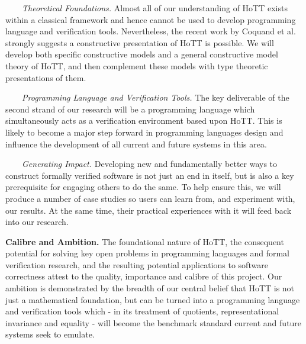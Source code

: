 \documentclass[a4paper,11pt]{article}
\begin{document}



$\;\;\; \;\;\;$ {\em Theoretical Foundations.} Almost all of our understanding
  of HoTT exists within a classical framework and hence cannot be used
  to develop programming language and verification tools. Nevertheless, the recent
  work by Coquand et al. strongly suggests a constructive presentation of HoTT
  is possible. We will develop both specific constructive models
  and a general constructive model theory of HoTT, and then complement
  these models with type theoretic presentations of them.

$\;\;\;\;\;\;$ {\em Programming Language and Verification Tools.} The key
  deliverable of the second strand of our research will be a
  programming language which simultaneously acts as a verification
  environment based upon HoTT. This is likely to become a major
  step forward in programming languages design and influence
  the development of all current and future systems in this area.

$\;\;\;\;\;\;$ {\em Generating Impact.} Developing new and fundamentally
  better ways to construct formally verified software is not just an
  end in itself, but is also a key prerequisite for engaging others to
  do the same.  To help ensure this, we will produce a number of case studies so
  users can learn from, and experiment with, our results. At the same time, their
  practical experiences with it will feed back into our research.

{\bf Calibre and Ambition.} The foundational nature of HoTT, the
consequent potential for solving key open problems in programming
languages and formal verification research, and the resulting
potential applications to software correctness attest to the quality,
importance and calibre of this project. Our ambition is demonstrated by the
breadth of our central belief that HoTT is not just a mathematical
foundation, but can be turned into a programming
language and verification tools which - in its treatment of
quotients, representational invariance and equality - will become the
benchmark standard current and future systems seek to
emulate.
\end{document}
